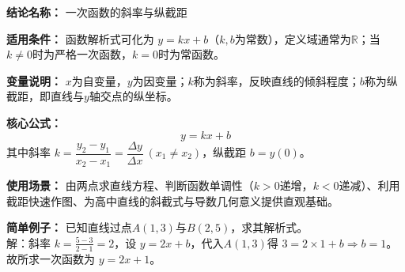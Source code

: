 \textbf{结论名称：} 一次函数的斜率与纵截距

\textbf{适用条件：} 函数解析式可化为 \(y=kx+b\)（\(k,b\)为常数），定义域通常为\(\mathbb{R}\)；当\(k \neq 0\)时为严格一次函数，\(k=0\)时为常函数。

\textbf{变量说明：} \(x\)为自变量，\(y\)为因变量；\(k\)称为斜率，反映直线的倾斜程度；\(b\)称为纵截距，即直线与\(y\)轴交点的纵坐标。

\textbf{核心公式：}
\[
\boxed{y = kx + b}
\]
其中斜率 \(k = \dfrac{y_2 - y_1}{x_2 - x_1} = \dfrac{\Delta y}{\Delta x}\ (x_1 \neq x_2)\)，纵截距 \(b = y(0)\)。

\textbf{使用场景：} 由两点求直线方程、判断函数单调性（\(k>0\)递增，\(k<0\)递减）、利用截距快速作图、为高中直线的斜截式与导数几何意义提供直观基础。

\textbf{简单例子：} 已知直线过点\(A(1,3)\)与\(B(2,5)\)，求其解析式。\\
解：斜率 \(k = \frac{5-3}{2-1} = 2\)，设 \(y=2x+b\)，代入\(A(1,3)\)得 \(3=2\times1+b \Rightarrow b=1\)。\\
故所求一次函数为 \(y = 2x + 1\)。